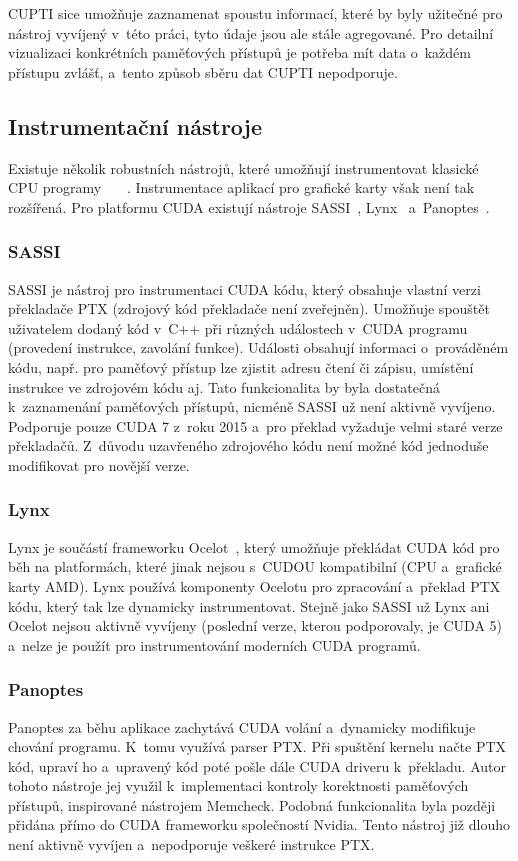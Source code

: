 CUPTI sice umožňuje zaznamenat spoustu informací, které by byly užitečné pro nástroj vyvíjený v~této práci, tyto údaje jsou ale stále agregované. Pro detailní vizualizaci konkrétních paměťových přístupů je potřeba mít data o~každém přístupu zvlášť, a~tento způsob sběru dat CUPTI nepodporuje.

\subsection{Instrumentační nástroje}
Existuje několik robustních nástrojů, které umožňují instrumentovat klasické CPU programy~\cite{valgrind}~\cite{pin} ~\cite{dynamorio}. Instrumentace aplikací pro grafické karty však není tak rozšířená. Pro platformu CUDA existují nástroje SASSI~\cite{sassi}, Lynx~\cite{lynx} a~Panoptes~\cite{panoptes}.

\subsubsection*{SASSI}
SASSI je nástroj pro instrumentaci CUDA kódu, který obsahuje vlastní verzi překladače PTX (zdrojový kód překladače není zveřejněn). Umožňuje spouštět uživatelem dodaný kód v~C++ při různých událostech v~CUDA programu (provedení instrukce, zavolání funkce). Události obsahují informaci o~prováděném kódu, např. pro paměťový přístup lze zjistit adresu čtení či zápisu, umístění instrukce ve zdrojovém kódu aj. Tato funkcionalita by byla dostatečná k~zaznamenání paměťových přístupů, nicméně SASSI už není aktivně vyvíjeno. Podporuje pouze CUDA 7 z~roku 2015 a~pro překlad vyžaduje velmi staré verze překladačů. Z~důvodu uzavřeného zdrojového kódu není možné kód jednoduše modifikovat pro novější verze.

\subsubsection*{Lynx}
Lynx je součástí frameworku Ocelot~\cite{ocelot}, který umožňuje překládat CUDA kód pro běh na platformách, které jinak nejsou s~CUDOU kompatibilní (CPU a~grafické karty AMD). Lynx používá komponenty Ocelotu pro zpracování a~překlad PTX kódu, který tak lze dynamicky instrumentovat. Stejně jako SASSI už Lynx ani Ocelot nejsou aktivně vyvíjeny (poslední verze, kterou podporovaly, je CUDA 5) a~nelze je použít pro instrumentování moderních CUDA programů.

\subsubsection*{Panoptes}
Panoptes za běhu aplikace zachytává CUDA volání a~dynamicky modifikuje chování programu. K~tomu využívá parser PTX. Při spuštění kernelu načte PTX kód, upraví ho a~upravený kód poté pošle dále CUDA driveru k~překladu. Autor tohoto nástroje jej využil k~implementaci kontroly korektnosti paměťových přístupů, inspirované nástrojem Memcheck. Podobná funkcionalita byla později přidána přímo do CUDA frameworku společností Nvidia. Tento nástroj již dlouho není aktivně vyvíjen a~nepodporuje veškeré instrukce PTX.


